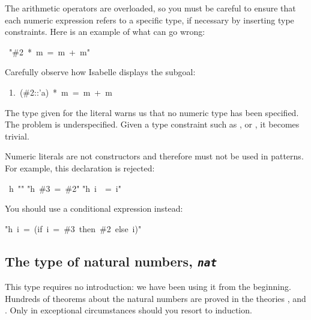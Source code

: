 \begin{warn}
The arithmetic operators are 
overloaded, so you must be careful to ensure that each numeric 
expression refers to a specific type, if necessary by inserting 
type constraints.  Here is an example of what can go wrong:
\par
\begin{isabelle}
\ "\#2\ *\ m\ =\ m\ +\ m"
\end{isabelle}
%
Carefully observe how Isabelle displays the subgoal:
\begin{isabelle}
\ 1.\ (\#2::'a)\ *\ m\ =\ m\ +\ m
\end{isabelle}
The type  given for the literal  warns us that no numeric
type has been specified.  The problem is underspecified.  Given a type
constraint such as ,  or , it becomes trivial.
\end{warn}

\begin{warn}
Numeric literals are not constructors and therefore must not be used in
patterns.  For example, this declaration is rejected:
\begin{isabelle}
\ h\ "\isacharbraceleft \isacharbraceright "\isanewline
"h\ \#3\ =\ \#2"\isanewline
"h\ i\ \ =\ i"
\end{isabelle}

You should use a conditional expression instead:
\begin{isabelle}
"h\ i\ =\ (if\ i\ =\ \#3\ then\ \#2\ else\ i)"
\end{isabelle}
\end{warn}



\subsection{The type of natural numbers, {\tt\slshape nat}}

This type requires no introduction: we have been using it from the
beginning.  Hundreds of theorems about the natural numbers are
proved in the theories ,  and .  Only
in exceptional circumstances should you resort to induction.

